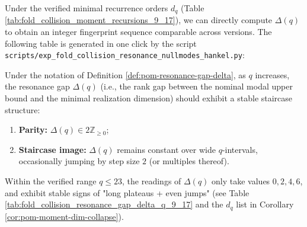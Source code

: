 \begin{remark}[Readings of \texorpdfstring{$\Delta(q)$}{Delta(q)} within the verified window (\(q=9,\dots,17\))]\label{rem:pom-delta-q9-17}
Under the verified minimal recurrence orders \(d_q\) (Table \ref{tab:fold_collision_moment_recursions_9_17}), we can directly compute \(\Delta(q)\) to obtain an integer fingerprint sequence comparable across versions.
The following table is generated in one click by the script \texttt{scripts/exp\_fold\_collision\_resonance\_nullmodes\_hankel.py}:
\end{remark}



\begin{conjecture}\label{conj:pom-delta-staircase}
Under the notation of Definition \ref{def:pom-resonance-gap-delta}, as \(q\) increases, the resonance gap \(\Delta(q)\) (i.e., the rank gap between the nominal modal upper bound and the minimal realization dimension) should exhibit a stable staircase structure:
\begin{enumerate}
  \item \textbf{Parity:} \(\Delta(q)\in 2\mathbb{Z}_{\ge 0}\);
  \item \textbf{Staircase image:} \(\Delta(q)\) remains constant over wide \(q\)-intervals, occasionally jumping by step size \(2\) (or multiples thereof).
\end{enumerate}
Within the verified range \(q\le 23\), the readings of \(\Delta(q)\) only take values \(0,2,4,6\), and exhibit stable signs of "long plateaus + even jumps" (see Table \ref{tab:fold_collision_resonance_gap_delta_q_9_17} and the \(d_q\) list in Corollary \ref{cor:pom-moment-dim-collapse}).
\end{conjecture}

